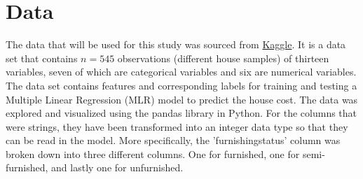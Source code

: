 \documentclass[12pt]{article}
\begin{document}
\section{Data}
\label{sec:data}


The data that will be used for this study was sourced from \href{https://www.kaggle.com/code/ashydv/housing-price-prediction-linear-regression/input}{Kaggle}. It is a data set that contains \(n = 545\) observations (different house samples) of thirteen variables, seven of which are categorical variables and six are numerical variables. The data set contains features and corresponding labels for training and testing a Multiple Linear Regression (MLR) model to predict the house cost.
The data was explored and visualized using the pandas library in Python. For the columns that were strings, they have been transformed into an integer data type so that they can be read in the model. More specifically, the 'furnishingstatus' column was broken down into three different columns. One for furnished, one for semi-furnished, and lastly one for unfurnished. 
\end{document}
